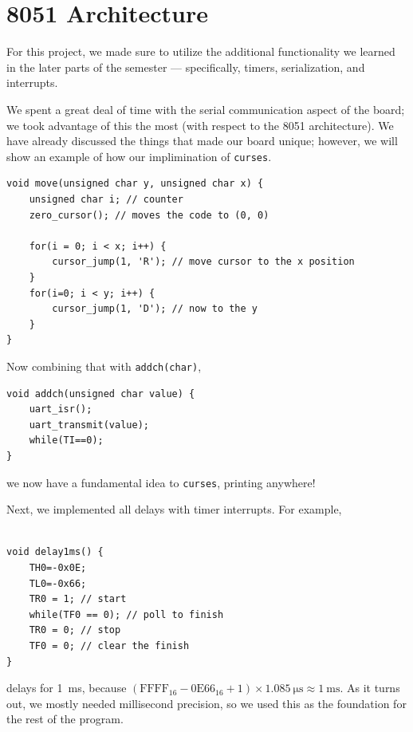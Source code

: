 \documentclass[12pt]{article}
\newcommand{\shellcmd}[1]{\texttt{\colorbox{gray!30}{#1}}}
\begin{document}
\section{8051 Architecture}
For this project, we made sure to utilize the additional functionality we learned in the later parts of the semester --- specifically, timers, serialization, and interrupts.

We spent a great deal of time with the serial communication aspect of the board; we took advantage of this the most (with respect to the \num{8051} architecture). We have already discussed the things that made our board unique; however, we will show an example of how our implimination of \shellcmd{curses}.

\begin{lstlisting}[style=cC]
void move(unsigned char y, unsigned char x) {
	unsigned char i; // counter
	zero_cursor(); // moves the code to (0, 0)

	for(i = 0; i < x; i++) {
		cursor_jump(1, 'R'); // move cursor to the x position
	}
	for(i=0; i < y; i++) {
		cursor_jump(1, 'D'); // now to the y
	}
}
\end{lstlisting}

\noindent Now combining that with \shellcmd{addch(char)},

\begin{lstlisting}[style=cC]
void addch(unsigned char value) {
	uart_isr();
	uart_transmit(value);
	while(TI==0);
}
\end{lstlisting}

\noindent we now have a fundamental idea to \shellcmd{curses}, printing anywhere!

Next, we implemented all delays with timer interrupts. For example,

\begin{lstlisting}[style=cC]

void delay1ms() {
	TH0=-0x0E;
    TL0=-0x66;
	TR0 = 1; // start
	while(TF0 == 0); // poll to finish
	TR0 = 0; // stop
	TF0 = 0; // clear the finish
}
\end{lstlisting}

\noindent delays for \SI{1}{\milli\second}, because $(\text{FFFF}_{16} - \text{0E66}_{16} + 1)\times\SI{1.085}{\micro\second} \approx \SI{1}{\milli\second}$. As it turns out, we mostly needed millisecond precision, so we used this as the foundation for the rest of the program.
\end{document}
